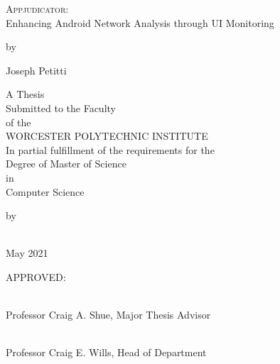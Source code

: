 \begin{titlepage}
\begin{center}
\doublespacing


{\Large \textsc{Appjudicator}: \\
Enhancing Android Network Analysis through UI Monitoring}

\vfill

by \par

Joseph Petitti

\vfill

A Thesis \\
Submitted to the Faculty \\
of the \\
WORCESTER POLYTECHNIC INSTITUTE \\
In partial fulfillment of the requirements for the \\
Degree of Master of Science \\
in \\
Computer Science \par

\vfill

by

\vspace{0.55cm}

\underline{\hspace{3in}} \\

May 2021

\end{center}

\vfill

\begin{flushleft}
APPROVED: \par
\vspace{\baselineskip}

\underline{\hspace{3in}} \\
Professor Craig A. Shue, Major Thesis Advisor \par
\vspace{\baselineskip}


\underline{\hspace{3in}} \\
Professor Craig E. Wills, Head of Department \par
\end{flushleft}
\end{titlepage}

